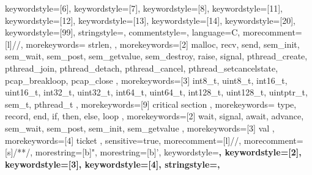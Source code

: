 {	keywordstyle=[6]\lstCFontVar,%
	keywordstyle=[7]\lstCFontSpecialBasic,%
	keywordstyle=[8]\lstCFontSpecialLib,%
	keywordstyle=[11]\lstCFontForeignA,%
	keywordstyle=[12]\lstCFontForeignB,%
	keywordstyle=[13]\lstCFontObject,%
	keywordstyle=[14]\lstCFontMoreKey,%
	keywordstyle=[20]\lstCFontString,%
	keywordstyle=[99]\lstCFontHighRed,%
	stringstyle=\lstCFontString,%
	commentstyle=\lstCFontComment,%
}%
%
{%
	language=C,%
	morecomment=[l]{//},%
	morekeywords={%
		strlen,
	},%
	morekeywords=[2]{%
		malloc,
		recv,
		send,
		sem_init,
		sem_wait,
		sem_post,
		sem_getvalue,
		sem_destroy,
		raise,
		signal,
		pthread_create,
		pthread_join,
		pthread_detach,
		pthread_cancel,
		pthread_setcancelstate,
		pcap_breakloop,
		pcap_close
	},%
	morekeywords=[3]{%
		int8_t,
		uint8_t,
		int16_t,
		uint16_t,
		int32_t,
		uint32_t,
		int64_t,
		uint64_t,
		int128_t,
		uint128_t,
		uintptr_t,
		sem_t,
		pthread_t
	},%
	morekeywords=[9]{%
		critical section
	},%
}%
%
{%
	morekeywords={%
		type,
		record,
		end,
		if,
		then,
		else,
		loop
	},%
	morekeywords=[2]{%
		wait,
		signal,
		await,
		advance,
		sem_wait,
		sem_post,
		sem_init,
		sem_getvalue
	},%
	morekeywords=[3]{%
		val
	},%
	morekeywords=[4]{%
		ticket
	},%
	sensitive=true,%
	morecomment=[l]{//},%
	morecomment=[s]{/*}{*/},%
	morestring=[b]",%
	morestring=[b]',%
	keywordstyle=\bfseries\ttfamily\color{blue},%
	keywordstyle=[2]\bfseries\ttfamily\color{teal},%
	keywordstyle=[3]\bfseries\ttfamily\color{olive},%
	keywordstyle=[4]\bfseries\ttfamily\color{olive},%
	stringstyle=\color{green}\ttfamily,%
}%
%
%
%
%
%
%
%
%
%
